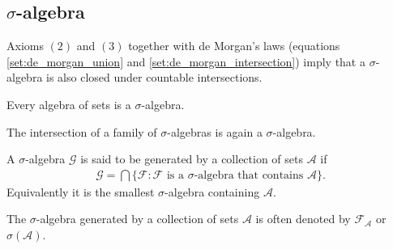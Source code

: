 
\subsection{\texorpdfstring{$\sigma$}{sigma}-algebra}

    \begin{remark}
        Axioms $(2)$ and $(3)$ together with de Morgan's laws (equations \ref{set:de_morgan_union} and \ref{set:de_morgan_intersection}) imply that a $\sigma$-algebra is also closed under countable intersections.
    \end{remark}

    \begin{result}
        Every algebra of sets is a $\sigma$-algebra.
    \end{result}

    \begin{property}
        The intersection of a family of $\sigma$-algebras is again a $\sigma$-algebra.
    \end{property}

    \begin{definition}
        A $\sigma$-algebra $\mathcal{G}$ is said to be generated by a collection of sets $\mathcal{A}$ if
        \begin{gather}
            \label{set:generated_sigma_algebra}
            \mathcal{G} = \bigcap\{\mathcal{F}:\mathcal{F} \text{ is a } \sigma\text{-algebra that contains } \mathcal{A}\}.
        \end{gather}
        Equivalently it is the smallest $\sigma$-algebra containing $\mathcal{A}$.
    \end{definition}
    \begin{notation}\label{set:notation:generated_sigma_algebra}
        The $\sigma$-algebra generated by a collection of sets $\mathcal{A}$ is often denoted by $\mathcal{F}_\mathcal{A}$ or $\sigma(\mathcal{A})$.
    \end{notation}

